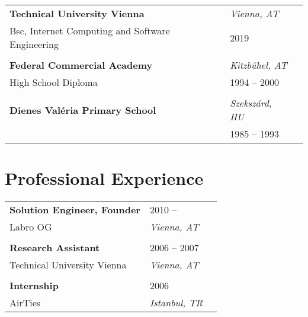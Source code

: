 \documentclass[letterpaper,11pt]{article}
\begin{document}
\vspace{-1em}
\begin{longtable}{  L{0.70\textwidth}  R{0.25\textwidth}  R{0.05\textwidth }} 
		\textbf{Technical University Vienna} &  \textit{Vienna, AT} \\

	Bsc, Internet Computing and Software Engineering & 2019 \\ 
\vspace{1pt}\\
		\textbf{Federal Commercial Academy} &  \textit{Kitzb\"{u}hel, AT} \\

	High School Diploma & 1994 -- 2000 \\ 
\vspace{1pt}\\
		\textbf{Dienes Val\'{e}ria Primary School} &  \textit{Szeksz\'{a}rd, HU} \\

	 & 1985 -- 1993 \\ 

\end{longtable}


\section{\bf Professional Experience}
\vspace{-1em}
\begin{longtable}{  L{0.70\textwidth}  R{0.25\textwidth}  R{0.05\textwidth }} 
\textbf{Solution Engineer, Founder} & 2010 -- \\
Labro OG & \textit{Vienna, AT} \\
\vspace{1pt}\\
\textbf{Research Assistant} & 2006 -- 2007\\
Technical University Vienna & \textit{Vienna, AT} \\
\vspace{1pt}\\
\textbf{Internship} & 2006\\
AirTies & \textit{Istanbul, TR} \\
\end{longtable}
\end{document}
